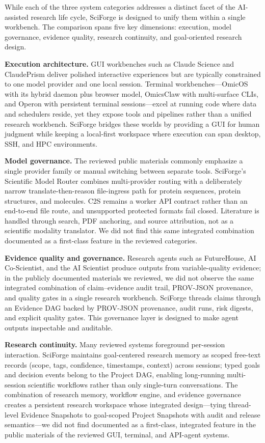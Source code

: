 \documentclass[sn-basic,Numbered,pdflatex]{sn-jnl}
\begin{document}
While each of the three system categories addresses a distinct facet of the AI-assisted research life cycle, SciForge is designed to unify them within a single workbench. The comparison spans five key dimensions: execution, model governance, evidence quality, research continuity, and goal-oriented research design.

\textbf{Execution architecture.} GUI workbenches such as Claude Science and ClaudePrism deliver polished interactive experiences but are typically constrained to one model provider and one local session. Terminal workbenches---OmicOS with its hybrid daemon plus browser model, OmicsClaw with multi-surface CLIs, and Operon with persistent terminal sessions---excel at running code where data and schedulers reside, yet they expose tools and pipelines rather than a unified research workbench. SciForge bridges these worlds by providing a GUI for human judgment while keeping a local-first workspace where execution can span desktop, SSH, and HPC environments.

\textbf{Model governance.} The reviewed public materials commonly emphasize a single provider family or manual switching between separate tools. SciForge's Scientific Model Router combines multi-provider routing with a deliberately narrow translate-then-reason file-ingress path for protein sequences, protein structures, and molecules. C2S remains a worker API contract rather than an end-to-end file route, and unsupported protected formats fail closed. Literature is handled through search, PDF anchoring, and source attribution, not as a scientific modality translator. We did not find this same integrated combination documented as a first-class feature in the reviewed categories.

\textbf{Evidence quality and governance.} Research agents such as FutureHouse, AI Co-Scientist, and the AI Scientist produce outputs from variable-quality evidence; in the publicly documented materials we reviewed, we did not observe the same integrated combination of claim--evidence audit trail, PROV-JSON provenance, and quality gates in a single research workbench. SciForge threads claims through an Evidence DAG backed by PROV-JSON provenance, audit runs, risk digests, and explicit quality gates. This governance layer is designed to make agent outputs inspectable and auditable.

\textbf{Research continuity.} Many reviewed systems foreground per-session interaction. SciForge maintains goal-centered research memory as scoped free-text records (scope, tags, confidence, timestamps, context) across sessions; typed goals and decision events belong to the Project DAG, enabling long-running multi-session scientific workflows rather than only single-turn conversations. The combination of research memory, workflow engine, and evidence governance creates a persistent research workspace whose integrated design---tying thread-level Evidence Snapshots to goal-scoped Project Snapshots with audit and release semantics---we did not find documented as a first-class, integrated feature in the public materials of the reviewed GUI, terminal, and API-agent systems.
\end{document}
